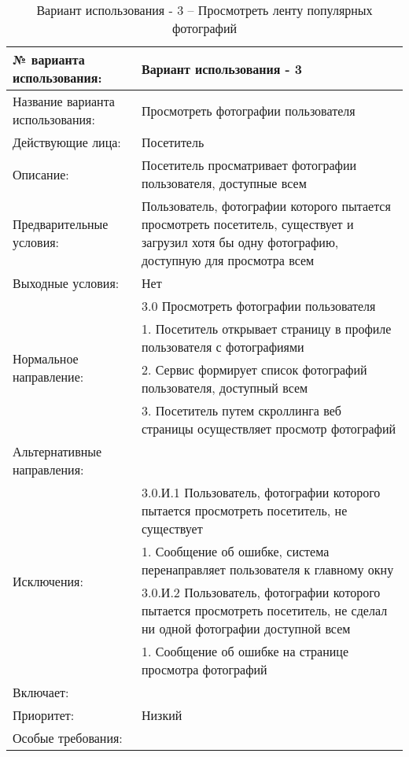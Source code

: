 \begin{table}[H]
  \caption{Вариант использования - 3 – Просмотреть ленту популярных фотографий}\label{use-case-3-table}
  \begin{tabular}{|p{6cm}|p{10cm}|}
  \hline № варианта использования: & Вариант использования - 3 \\
  \hline Название варианта использования: & Просмотреть фотографии пользователя \\
  \hline Действующие лица: & Посетитель \\
  \hline Описание: & Посетитель просматривает фотографии пользователя, доступные всем \\
  \hline Предварительные условия: & Пользователь, фотографии которого пытается просмотреть посетитель, существует и загрузил хотя бы одну фотографию, доступную для просмотра всем \\
  \hline Выходные условия: & Нет \\
  \hline \multirow{4}{*}{Нормальное направление:} & 3.0 Просмотреть фотографии пользователя \\
  \cline{2-2} & 1. Посетитель открывает страницу в профиле пользователя с фотографиями \\
  \cline{2-2} & 2. Сервис формирует список фотографий пользователя, доступный всем \\
  \cline{2-2} & 3. Посетитель путем скроллинга веб страницы осуществляет просмотр фотографий \\
  \hline Альтернативные направления: &  \\
  \hline \multirow{4}{*}{Исключения:} & 3.0.И.1 Пользователь, фотографии которого пытается просмотреть посетитель, не существует \\
  \cline{2-2} & 1. Сообщение об ошибке, система перенаправляет пользователя к главному окну \\
  \cline{2-2} & 3.0.И.2 Пользователь, фотографии которого пытается просмотреть посетитель, не сделал ни одной фотографии доступной всем \\
  \cline{2-2} & 1. Сообщение об ошибке на странице просмотра фотографий \\
  \hline Включает: &  \\
  \hline Приоритет: & Низкий \\
  \hline Особые требования: &  \\
  \hline 
  \end{tabular}
\end{table}

